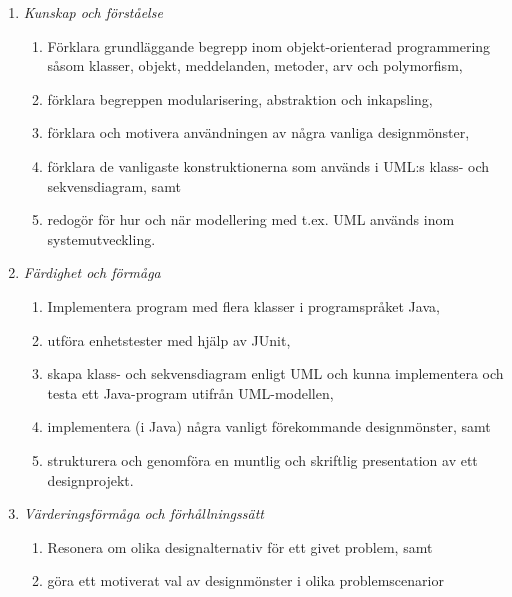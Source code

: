 \begin{enumerate}
\def\labelenumi{\Alph{enumi}.}
\tightlist
\item
  \emph{Kunskap och förståelse}

  \begin{enumerate}
  \def\labelenumii{\Alph{enumi}.\arabic{enumii}.}
  \tightlist
  \item
    Förklara grundläggande begrepp inom objekt-orienterad programmering
    såsom klasser, objekt, meddelanden, metoder, arv och polymorfism,
  \item
    förklara begreppen modularisering, abstraktion och inkapsling,
  \item
    förklara och motivera användningen av några vanliga designmönster,
  \item
    förklara de vanligaste konstruktionerna som används i UML:s klass-
    och sekvensdiagram, samt
  \item
    redogör för hur och när modellering med t.ex. UML används inom
    systemutveckling.
  \end{enumerate}
\item
  \emph{Färdighet och förmåga}

  \begin{enumerate}
  \def\labelenumii{\Alph{enumi}.\arabic{enumii}.}
  \tightlist
  \item
    Implementera program med flera klasser i programspråket Java,
  \item
    utföra enhetstester med hjälp av JUnit,
  \item
    skapa klass- och sekvensdiagram enligt UML och kunna implementera
    och testa ett Java-program utifrån UML-modellen,
  \item
    implementera (i Java) några vanligt förekommande designmönster, samt
  \item
    strukturera och genomföra en muntlig och skriftlig presentation av
    ett designprojekt.
  \end{enumerate}
\item
  \emph{Värderingsförmåga och förhållningssätt}

  \begin{enumerate}
  \def\labelenumii{\Alph{enumi}.\arabic{enumii}.}
  \tightlist
  \item
    Resonera om olika designalternativ för ett givet problem, samt
  \item
    göra ett motiverat val av designmönster i olika problemscenarior
  \end{enumerate}
\end{enumerate}

